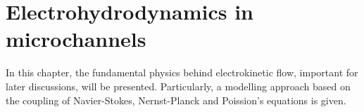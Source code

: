 \chapter{Electrohydrodynamics in microchannels}

In this chapter, the fundamental physics behind electrokinetic flow,
important for later discussions, will be presented. Particularly, a
modelling approach based on the coupling of Navier-Stokes,
Nernst-Planck and Poission's equations is given.



















